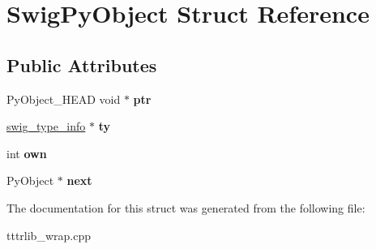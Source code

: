 \hypertarget{struct_swig_py_object}{}\section{Swig\+Py\+Object Struct Reference}
\label{struct_swig_py_object}
\subsection*{Public Attributes}
\begin{DoxyCompactItemize}
\item 
\mbox{\label{struct_swig_py_object_a41b1d569a8ba4fa9b1d87579c144891b}} 
Py\+Object\+\_\+\+H\+E\+AD void $\ast$ {\bfseries ptr}
\item 
\mbox{\label{struct_swig_py_object_a510b5a6f66a8a33c0a54c3eeb83e5ba5}} 
\hyperlink{structswig__type__info}{swig\+\_\+type\+\_\+info} $\ast$ {\bfseries ty}
\item 
\mbox{\label{struct_swig_py_object_a83cb6489fb1b171467f06c091ae6f283}} 
int {\bfseries own}
\item 
\mbox{\label{struct_swig_py_object_af7b93d7ae49a6f3bdf6511043fe8e839}} 
Py\+Object $\ast$ {\bfseries next}
\end{DoxyCompactItemize}


The documentation for this struct was generated from the following file\+:\begin{DoxyCompactItemize}
\item 
tttrlib\+\_\+wrap.\+cpp\end{DoxyCompactItemize}
